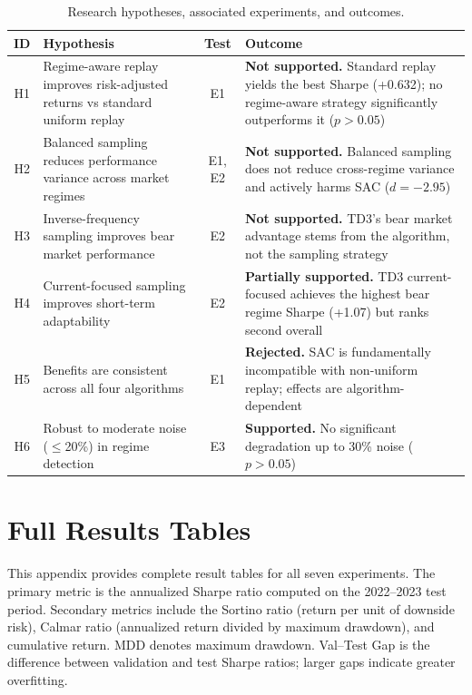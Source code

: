 \documentclass[11pt,a4paper]{article}
\begin{document}
\begin{table}[H]
\centering
\small
\caption{Research hypotheses, associated experiments, and outcomes.}
\label{tab:hypotheses}
\begin{tabular}{@{}cp{5.2cm}cp{6.2cm}@{}}
\toprule
\textbf{ID} & \textbf{Hypothesis} & \textbf{Test} & \textbf{Outcome} \\
\midrule
H1 & Regime-aware replay improves risk-adjusted returns vs standard uniform replay & E1 & \textbf{Not supported.} Standard replay yields the best Sharpe (+0.632); no regime-aware strategy significantly outperforms it ($p > 0.05$) \\[6pt]
H2 & Balanced sampling reduces performance variance across market regimes & E1, E2 & \textbf{Not supported.} Balanced sampling does not reduce cross-regime variance and actively harms SAC ($d = -2.95$) \\[6pt]
H3 & Inverse-frequency sampling improves bear market performance & E2 & \textbf{Not supported.} TD3's bear market advantage stems from the algorithm, not the sampling strategy \\[6pt]
H4 & Current-focused sampling improves short-term adaptability & E2 & \textbf{Partially supported.} TD3 current-focused achieves the highest bear regime Sharpe (+1.07) but ranks second overall \\[6pt]
H5 & Benefits are consistent across all four algorithms & E1 & \textbf{Rejected.} SAC is fundamentally incompatible with non-uniform replay; effects are algorithm-dependent \\[6pt]
H6 & Robust to moderate noise ($\leq$20\%) in regime detection & E3 & \textbf{Supported.} No significant degradation up to 30\% noise ($p > 0.05$) \\
\bottomrule
\end{tabular}
\end{table}


\section{Full Results Tables}
\label{app:results}

This appendix provides complete result tables for all seven experiments. The primary metric is the annualized Sharpe ratio computed on the 2022--2023 test period. Secondary metrics include the Sortino ratio (return per unit of downside risk), Calmar ratio (annualized return divided by maximum drawdown), and cumulative return. MDD denotes maximum drawdown. Val--Test Gap is the difference between validation and test Sharpe ratios; larger gaps indicate greater overfitting.
\end{document}
